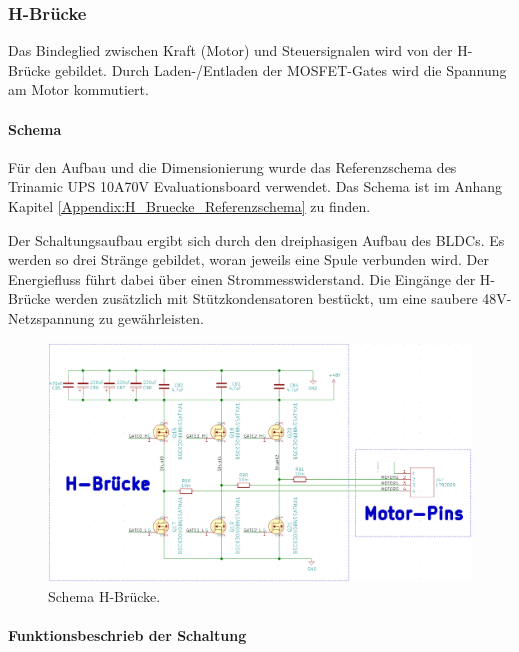 \subsubsection{H-Brücke}
\label{subsubsec:H-Brücke}

Das Bindeglied zwischen Kraft (Motor) und Steuersignalen wird von der H-Brücke gebildet. Durch Laden-/Entladen der MOSFET-Gates wird die Spannung am Motor kommutiert.

\paragraph{Schema}\mbox{}

Für den Aufbau und die Dimensionierung wurde das Referenzschema des Trinamic UPS 10A70V Evaluationsboard verwendet. Das Schema ist im Anhang Kapitel \ref{Appendix:H_Bruecke_Referenzschema} zu finden.

Der Schaltungsaufbau ergibt sich durch den dreiphasigen Aufbau des BLDCs. Es werden so drei Stränge gebildet, woran jeweils eine Spule verbunden wird. Der Energiefluss führt dabei über einen Strommesswiderstand. Die Eingänge der H-Brücke werden zusätzlich mit Stützkondensatoren bestückt, um eine saubere 48V-Netzspannung zu gewährleisten.

\begin{figure}[H]
	\centering
	\includegraphics[width=\textwidth]{graphics/Schema_H_Bruecke_und_BLDC}
	\caption{Schema H-Brücke.}
	\label{fig:Schema_H_Bruecke_und_BLDC}
\end{figure}

\paragraph{Funktionsbeschrieb der Schaltung}\mbox{}

